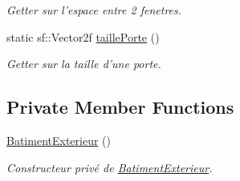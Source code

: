 \begin{DoxyCompactItemize}
\begin{DoxyCompactList}\small\item\em Getter sur l'espace entre 2 fenetres. \end{DoxyCompactList}\item 
\hypertarget{classPropriete_1_1BatimentExterieur_ab2f8ceea06b3244073b15cbd8845711c}{static sf\-::\-Vector2f \hyperlink{classPropriete_1_1BatimentExterieur_ab2f8ceea06b3244073b15cbd8845711c}{taille\-Porte} ()}\label{classPropriete_1_1BatimentExterieur_ab2f8ceea06b3244073b15cbd8845711c}

\begin{DoxyCompactList}\small\item\em Getter sur la taille d'une porte. \end{DoxyCompactList}\end{DoxyCompactItemize}
\subsection*{Private Member Functions}
\begin{DoxyCompactItemize}
\item 
\hypertarget{classPropriete_1_1BatimentExterieur_a183d46942fb85a3807f4bca1ecb697e4}{\hyperlink{classPropriete_1_1BatimentExterieur_a183d46942fb85a3807f4bca1ecb697e4}{Batiment\-Exterieur} ()}\label{classPropriete_1_1BatimentExterieur_a183d46942fb85a3807f4bca1ecb697e4}

\begin{DoxyCompactList}\small\item\em Constructeur privé de \hyperlink{classPropriete_1_1BatimentExterieur}{Batiment\-Exterieur}. \end{DoxyCompactList}\end{DoxyCompactItemize}
